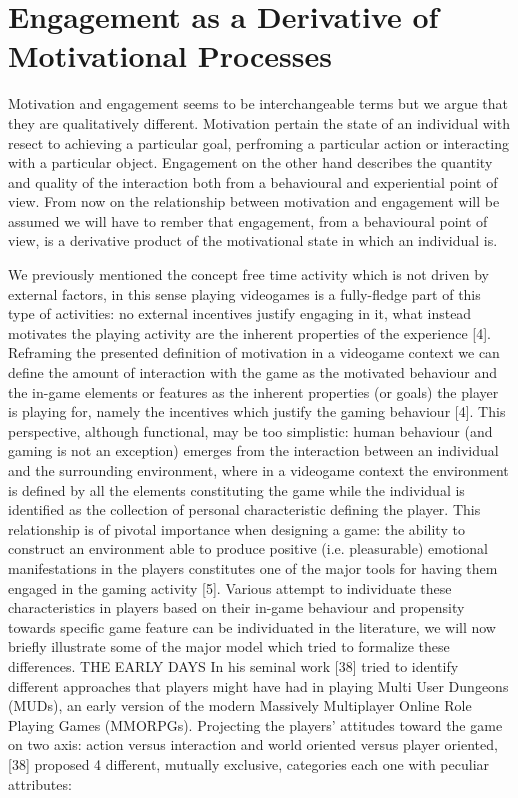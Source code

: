 \section{Engagement as a Derivative of Motivational Processes}
Motivation and engagement seems to be interchangeable terms but we argue that they are qualitatively different. Motivation pertain the state of an individual with resect to achieving a particular goal, perfroming a particular action or interacting with a particular object. Engagement on the other hand describes the quantity and quality of the interaction both from a behavioural and experiential point of view. From now on the relationship between motivation and engagement will be assumed we will have to rember that engagement, from a behavioural point of view, is a derivative product of the motivational state in which an individual is. 

We previously mentioned the concept free time activity which is not driven by external factors, in this sense playing videogames is a fully-fledge part of this type of activities: no external incentives justify engaging in it, what instead motivates the playing activity are the inherent properties of the experience [4]. Reframing the presented definition of motivation in a videogame context we can define the amount of interaction with the game as the motivated behaviour and the in-game elements or features as the inherent properties (or goals) the player is playing for, namely the incentives which justify the gaming behaviour [4]. This perspective, although functional, may be too simplistic: human behaviour (and gaming is not an exception) emerges from the interaction between an individual and the surrounding environment, where in a videogame context the environment is defined by all the elements constituting the game while the individual is identified as the collection of personal characteristic defining the player. This relationship is of pivotal importance when designing a game: the ability to construct an environment able to produce positive (i.e. pleasurable) emotional manifestations in the players constitutes one of the major tools for having them engaged in the gaming activity [5]. Various attempt to individuate these characteristics in players based on their in-game behaviour and propensity towards specific game feature can be individuated in the literature, we will now briefly illustrate some of the major model which tried to formalize these differences.
THE EARLY DAYS
In his seminal work [38] tried to identify different approaches that players might have had in playing Multi User Dungeons (MUDs), an early version of the modern Massively Multiplayer Online Role Playing Games (MMORPGs). Projecting the players’ attitudes toward the game on two axis: action versus interaction and world oriented versus player oriented, [38] proposed 4 different, mutually exclusive, categories each one with peculiar attributes:
